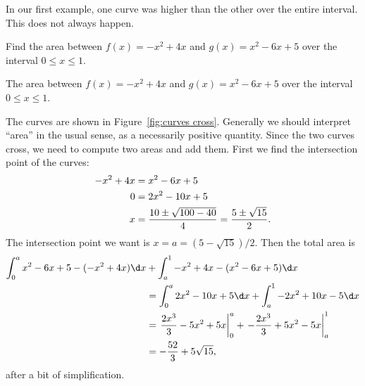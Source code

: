 \documentclass{ximera}
\begin{document}
In our first example, one curve was higher than the other over the
entire interval. This does not always happen.


\begin{example} Find the area between $f(x)= -x^2+4x$ and
$g(x)=x^2-6x+5$ over the interval $0\le x\le 1$.
\end{example}

\begin{marginfigure}
\caption{The area between $f(x)= -x^2+4x$ and
$g(x)=x^2-6x+5$ over the interval $0\le x\le 1$.}
\label{fig:curves cross}
\end{marginfigure}


\begin{solution}
The curves are shown in Figure~\ref{fig:curves cross}. Generally we
should interpret ``area'' in the usual sense, as a necessarily
positive quantity. Since the two curves cross, we need to compute two
areas and add them. First we find the intersection point of the
curves:
\begin{align*}
  -x^2+4x&=x^2-6x+5 \\
  0&=2x^2-10x+5 \\
  x&={10\pm\sqrt{100-40}\over4}={5\pm\sqrt{15}\over2}.
\end{align*}
The intersection point we want is $x=a=(5-\sqrt{15})/2$. Then
the total area is 
\begin{align*}
  \int_0^a x^2-6x+5-(-x^2+4x)\d x&+\int_a^1 -x^2+4x-(x^2-6x+5)\d x \\
  &=\int_0^a 2x^2-10x+5\d x+\int_a^1 -2x^2+10x-5\d x \\
  &=\left.{2x^3\over3}-5x^2+5x\right|_0^a + 
    \left.-{2x^3\over3}+5x^2-5x\right|_a^1 \\
  &=-{52\over3}+5\sqrt{15},
\end{align*}
after a bit of simplification.
\end{solution}
\end{document}
